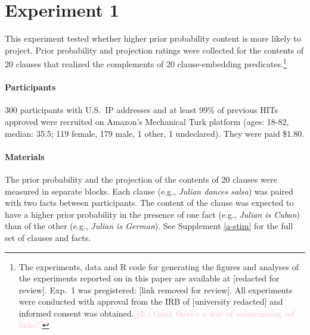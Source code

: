 \documentclass[11pt,fleqn]{article}
\newcommand{\jd}[1]{\textcolor{Pink}{[jd: #1]}}
\newcommand{\jt}[1]{\textbf{\color{blue}JT: #1}}
\newcommand{\6}{\mbox{$[\hspace*{-.6mm}[$}}
\newcommand{\9}{\mbox{$]\hspace*{-.6mm}]$}}
\begin{document}


\section{Experiment 1}\label{s2}

This experiment tested whether higher prior probability content is more likely to project. Prior probability and projection ratings were collected for the contents of 20 clauses that realized the complements of 20 clause-embedding predicates.\footnote{\label{f-github}The experiments, data and R code for generating the figures and analyses of the experiments reported on in this paper are available at [redacted for review]. Exp.~1 was pregistered: [link removed for review]. All experiments were conducted with approval from the IRB of [university redacted] and informed consent was obtained.\jd{i think there's a way of anonymizing osf links?}}

\paragraph{Participants} 300 participants with U.S.\ IP addresses and at least 99\% of previous HITs approved were recruited on Amazon's Mechanical Turk platform (ages: 18-82, median: 35.5; 119 female, 179 male, 1 other, 1 undeclared). They were paid \$1.80.

\paragraph{Materials} The prior probability and the projection of the contents of 20 clauses were measured in separate blocks. Each clause (e.g., \emph{Julian dances salsa}) was paired with two facts between participants. The content of the clause was expected to have a higher prior probability in the presence of one fact (e.g., \emph{Julian is Cuban}) than of the other (e.g., \emph{Julian is German}). See Supplement \ref{a-stim} for the full set of clauses and facts. 
\end{document}
